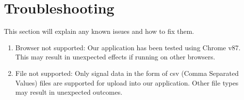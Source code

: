 \section{Troubleshooting}
This section will explain any known issues and how to fix them.

\begin{enumerate}
\item Browser not supported: Our application has been tested using Chrome v87. This may result in unexpected effects if running on other browsers.
\item File not supported: Only signal data in the form of csv (Comma Separated Values) files are supported for upload into our application. Other file types may result in unexpected outcomes.
\end{enumerate}
